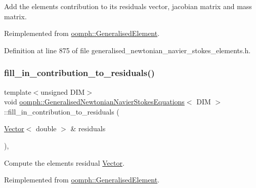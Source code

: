 Add the element\textquotesingle{}s contribution to its residuals vector, jacobian matrix and mass matrix. 



Reimplemented from \hyperlink{classoomph_1_1GeneralisedElement_a2b6294a730647cf865da94f2531466f8}{oomph\+::\+Generalised\+Element}.



Definition at line 875 of file generalised\+\_\+newtonian\+\_\+navier\+\_\+stokes\+\_\+elements.\+h.

\mbox{\label{classoomph_1_1GeneralisedNewtonianNavierStokesEquations_a6caf76fe70722b03b4826aa4b1dd6612}} 
\subsubsection{\texorpdfstring{fill\+\_\+in\+\_\+contribution\+\_\+to\+\_\+residuals()}{fill\_in\_contribution\_to\_residuals()}}
{\footnotesize\ttfamily template$<$unsigned D\+IM$>$ \\
void \hyperlink{classoomph_1_1GeneralisedNewtonianNavierStokesEquations}{oomph\+::\+Generalised\+Newtonian\+Navier\+Stokes\+Equations}$<$ D\+IM $>$\+::fill\+\_\+in\+\_\+contribution\+\_\+to\+\_\+residuals (\begin{DoxyParamCaption}\item[{\hyperlink{classoomph_1_1Vector}{Vector}$<$ double $>$ \&}]{residuals }\end{DoxyParamCaption})\hspace{0.3cm}{\ttfamily [inline]}, {\ttfamily [virtual]}}



Compute the element\textquotesingle{}s residual \hyperlink{classoomph_1_1Vector}{Vector}. 



Reimplemented from \hyperlink{classoomph_1_1GeneralisedElement_a310c97f515e8504a48179c0e72c550d7}{oomph\+::\+Generalised\+Element}.



